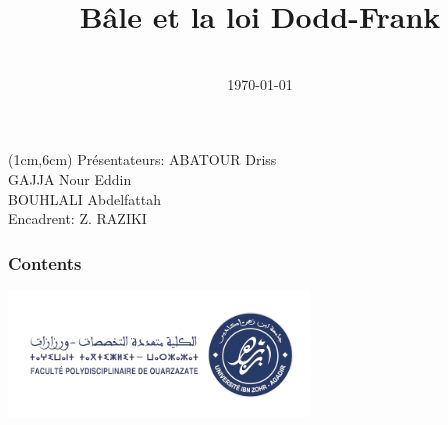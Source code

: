 \documentclass[aspectratio=43]{beamer}
\title[\meetingname]{Bâle et la loi Dodd-Frank}
\institute[FPO]{Faculté Polydisciplinaire de Ouarzazate}
\date[\mydate]{\meetingname\\\today}
\def\presenters{Présentateurs:   
            ABATOUR Driss 
            \\ \hspace{2.7cm} GAJJA Nour Eddin
            \\ \hspace{3.2cm} BOUHLALI Abdelfattah }
\def\supervisor{Encadrent: Z. RAZIKI}
\begin{document}
\begin{frame}[plain,t]
\titlepage
\begin{textblock*}{\linewidth}(1cm,6cm) %
    \centering
    \small \presenters \\
    \small \supervisor
\end{textblock*}
\end{frame}

\begin{frame}
\frametitle{Contents}
\tableofcontents
\end{frame}













\begin{frame}[plain,t]
\vspace{100pt}
\centering
\includegraphics[width=0.6\textwidth]{Assets/fpo_logo.png}
\end{frame}
\end{document}
